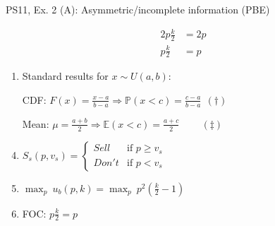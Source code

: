 \begin{frame}{PS11, Ex. 2 (A): Asymmetric/incomplete information (PBE)}
\begin{multicols}{2}
\begin{align*}
        2p\frac{k}{2}&=2p\\
        p\frac{k}{2}&=p
      \end{align*}
      \vfill\null\columnbreak
      \begin{enumerate}
        \item Standard results for $x\sim U(a, b):$
        \item[CDF:] $F(x)=\frac{x-a}{b-a}\Rightarrow\mathbb{P}(x<c)=\frac{c-a}{b-a}\ \ (\dagger)$
        \item[Mean:] $\mu=\frac{a+b}{2}\Rightarrow\mathbb{E}(x<c)=\frac{a+c}{2}\quad\quad\ (\ddagger)$
        \item $S_s(p,v_s)=\left\{\begin{array}{ll}
          Sell  & \text{if }p\geq v_s \\
          Don't & \text{if }p < v_s
        \end{array}\right.$
        \item $\displaystyle{\max_p}\ u_b(p,k)=\displaystyle{\max_p}\ p^2\left(\frac{k}{2}-1\right)$
        \item FOC: $p\frac{k}{2}=p$
      \end{enumerate}
      \vfill\null
    \end{multicols}
\end{frame}
